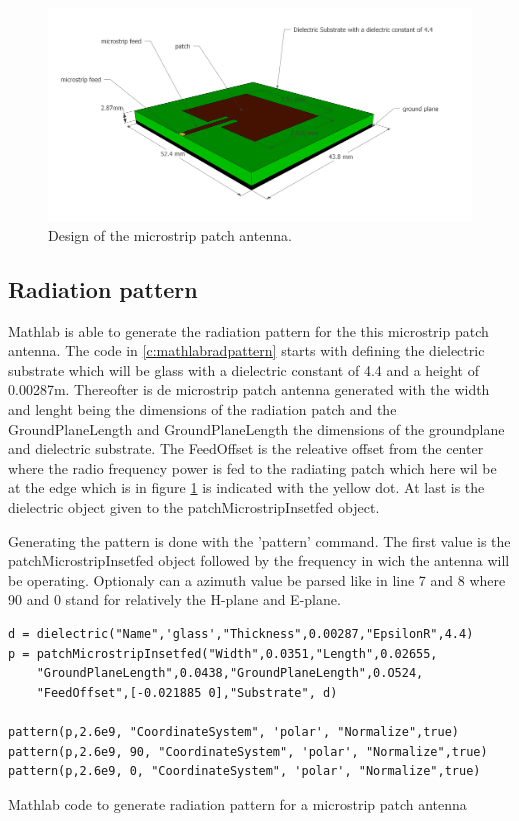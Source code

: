 \begin{figure}[h!]
  \includegraphics[width=\textwidth]{../images/MicrostripAntenna.jpg}
  \caption{Design of the microstrip patch antenna.}
  \label{fig:antennadesign}
\end{figure}

\subsection{Radiation pattern}
Mathlab is able to generate the radiation pattern for the this microstrip patch antenna.
The code in  \ref{c:mathlabradpattern} starts with defining the dielectric substrate which will be glass with a dielectric constant
of 4.4 and a height of 0.00287m. Thereofter is de microstrip patch antenna generated with the width and lenght being the dimensions
of the radiation patch and the GroundPlaneLength and GroundPlaneLength the dimensions of the groundplane and dielectric substrate.
The FeedOffset is the releative offset from the center where the radio frequency power is fed to the radiating patch which here wil be
at the edge which is in figure \ref{fig:antennadesign} is indicated with the yellow dot. At last is the dielectric object given to the patchMicrostripInsetfed object.

Generating the pattern is done with the 'pattern' command. The first value is the patchMicrostripInsetfed object followed by the frequency
in wich the antenna will be operating. Optionaly can a azimuth value be parsed like in line 7 and 8 where 90 and 0 stand for relatively the H-plane and E-plane.

\begin{listing}[h!]
\begin{verbatim}
d = dielectric("Name",'glass',"Thickness",0.00287,"EpsilonR",4.4)
p = patchMicrostripInsetfed("Width",0.0351,"Length",0.02655,
    "GroundPlaneLength",0.0438,"GroundPlaneLength",0.O524,
    "FeedOffset",[-0.021885 0],"Substrate", d)

pattern(p,2.6e9, "CoordinateSystem", 'polar', "Normalize",true)
pattern(p,2.6e9, 90, "CoordinateSystem", 'polar', "Normalize",true)
pattern(p,2.6e9, 0, "CoordinateSystem", 'polar', "Normalize",true)
\end{verbatim}
\caption{Mathlab code to generate radiation pattern for a microstrip patch antenna}
\label{c:mathlabradpattern}
\end{listing}


